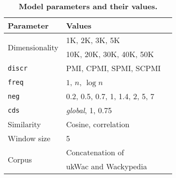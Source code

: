 \begin{table}
  \centering
  \begin{tabular}{llc}
    \toprule
    Parameter & Values \\
    \midrule
    \multirow{2}{*}{Dimensionality} & 1K, 2K, 3K, 5K \\
                                    & 10K, 20K, 30K, 40K, 50K \\
    \texttt{discr} & PMI, CPMI, SPMI, SCPMI \\
    \texttt{freq} & $1$, $n$, $\log n$ \\
    \texttt{neg} & 0.2, 0.5, 0.7, 1, 1.4, 2, 5, 7 \\
    \texttt{cds} & \textit{global}, 1, 0.75 \\
    Similarity & Cosine, correlation \\
    Window size & 5                                \\
    \multirow{2}{*}{Corpus} & Concatenation of \\
                            & ukWac and Wackypedia \\
    \bottomrule
  \end{tabular}
  \caption{\textbf{Model parameters and their values.}}
\label{tab:parameters}
\end{table}

